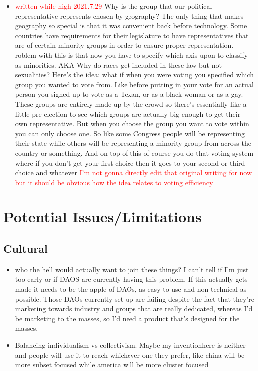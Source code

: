\documentclass{article}[10pt]
\begin{document}
\begin{itemize}
    \item \textcolor{red}{written while high 2021.7.29}
    Why is the group that our political representative represents chosen by geography? 
    The only thing that makes geography so special is that it was convenient back before technology. 
    Some countries have requirements for their legislature to have representatives that are of certain minority groups in order to ensure proper representation. 
    roblem with this is that now you have to specify which axis upon to classify as minorities. 
    AKA Why do races get included in these law but not sexualities?
    Here’s the idea: what if when you were voting you specified which group you wanted to vote from. 
    Like before putting in  your vote for an actual person you signed up to vote as a Texan, or as a black woman or as a gay. 
    These groups are entirely made up by the crowd so there’s essentially like a little pre-election to see which groups are actually big enough to get their own representative. 
    But when you choose the group you want to vote within you can only choose one. 
    So like some Congress people will be representing their state while others will be representing a minority group from across the country or something. And on top of this of course you do that voting system where if you don’t get your first choice then it goes to your second or third choice and whatever
    \textcolor{red}{I'm not gonna directly edit that original writing for now but it should be obvious how the idea relates to voting efficiency}
\end{itemize}

\section{Potential Issues/Limitations}
\label{section:Issues}

\subsection{Cultural}
\begin{itemize}
    \item who the hell would actually want to join these things? 
    I can't tell if I'm just too early or if DAOS are currently having this problem. 
    If this actually gets made it needs to be the apple of DAOs, as easy to use and non-technical as possible. 
    Those DAOs currently set up are failing despite the fact that they're marketing towards industry and groups that are really dedicated, whereas I'd be marketing to the masses, so I'd need a product that's designed for the masses.
    
    \item Balancing individualism vs collectivism.
    Maybe my inventionhere is neither and people will use it to reach whichever one they prefer, like china will be more subset focused while america will be more cluster focused
\end{itemize}
\end{document}
